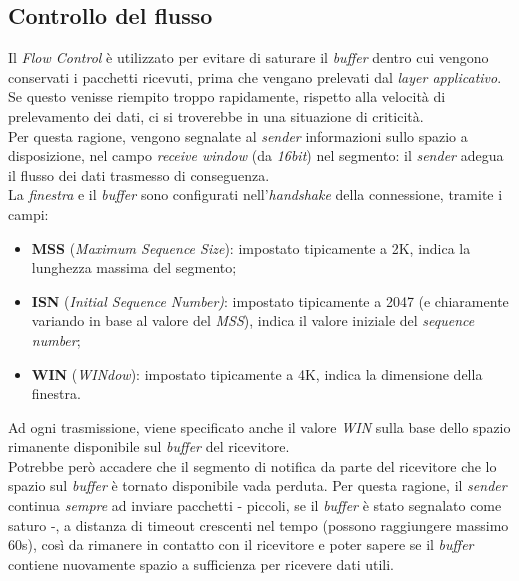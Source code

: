 \subsection{Controllo del flusso}
Il \textit{Flow Control} è utilizzato per evitare di saturare il \textit{buffer} dentro cui vengono conservati i pacchetti ricevuti, prima che vengano prelevati dal \textit{layer applicativo}. Se questo venisse riempito troppo rapidamente, rispetto alla velocità di prelevamento dei dati, ci si troverebbe in una situazione di criticità. \\
Per questa ragione, vengono segnalate al \textit{sender} informazioni sullo spazio a disposizione, nel campo \textit{receive window} (da \textit{16bit}) nel segmento: il \textit{sender} adegua il flusso dei dati trasmesso di conseguenza. \\
La \textit{finestra} e il \textit{buffer} sono configurati nell'\textit{handshake} della connessione, tramite i campi:
\begin{itemize}
    \item \textbf{MSS} (\textit{Maximum Sequence Size}): impostato tipicamente a 2K, indica la lunghezza massima del segmento;
    \item \textbf{ISN} (\textit{Initial Sequence Number)}: impostato tipicamente a 2047 (e chiaramente variando in base al valore del \textit{MSS}), indica il valore iniziale del \textit{sequence number};
    \item \textbf{WIN} (\textit{WINdow}): impostato tipicamente a 4K, indica la dimensione della finestra.
\end{itemize}
Ad ogni trasmissione, viene specificato anche il valore \textit{WIN} sulla base dello spazio rimanente disponibile sul \textit{buffer} del ricevitore. \\
Potrebbe però accadere che il segmento di notifica da parte del ricevitore che lo spazio sul \textit{buffer} è tornato disponibile vada perduta. Per questa ragione, il \textit{sender} continua \textit{sempre} ad inviare pacchetti - piccoli, se il \textit{buffer} è stato segnalato come saturo -, a distanza di timeout crescenti nel tempo (possono raggiungere massimo 60s), così da rimanere in contatto con il ricevitore e poter sapere se il \textit{buffer} contiene nuovamente spazio a sufficienza per ricevere dati utili.


